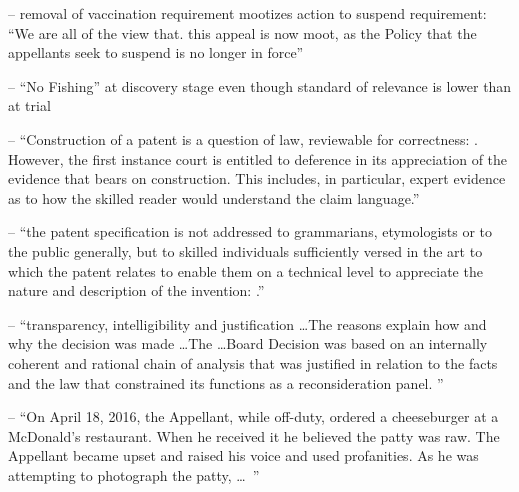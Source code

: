 -- removal of vaccination requirement mootizes action to suspend requirement: \enquote{We are all of the view that. this appeal is now moot, as the Policy that the appellants seek to suspend is no longer in force} 

-- ``No Fishing'' at discovery stage even though standard of relevance is lower than at trial

-- \enquote{Construction of a patent is a question of law, reviewable for correctness: . However, the first instance court is entitled to deference in its appreciation of the evidence that bears on construction. This includes, in particular, expert evidence as to how the skilled reader would understand the claim language.}

-- \enquote{the patent specification is not addressed to grammarians, etymologists or to the public generally, but to skilled individuals sufficiently versed in the art to which the patent relates to enable them on a technical level to appreciate the nature and description of the invention:  .}

-- \enquote{transparency, intelligibility and justification \ldots The reasons explain how and why the decision was made  \ldots The  \ldots Board Decision was based on an internally coherent and rational chain of analysis that was justified in relation to the facts and the law that constrained its functions as a reconsideration panel. }

-- ``On April 18, 2016, the Appellant, while off-duty, ordered a cheeseburger at a McDonald’s restaurant. When he received it he believed the patty was raw. The Appellant became upset and raised his voice and used profanities. As he was attempting to photograph the patty, \ldots\ ''



\printbibliographymcgill

